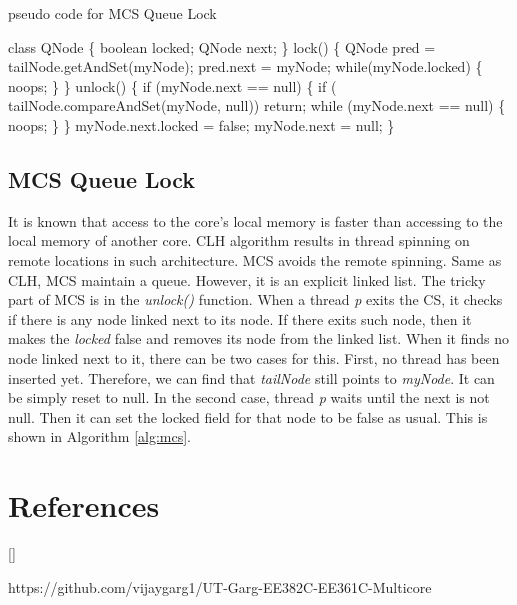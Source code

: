 \documentclass[twoside]{article}
\def\beginrefs{\begin{list}%
        {[\arabic{equation}]}{\usecounter{equation}
         \setlength{\leftmargin}{2.0truecm}\setlength{\labelsep}{0.4truecm}%
         \setlength{\labelwidth}{1.6truecm}}}
\def\endrefs{\end{list}}
\def\bibentry#1{\item[\hbox{[#1]}]}
\begin{document}
\begin{algorithm}
\caption{pseudo code for MCS Queue Lock}
\begin{algorithmic}[1]
\State class QNode \{
\State \indent boolean locked; 
\State \indent QNode next; 
\State \}
\State lock() \{
\State \indent QNode pred = tailNode.getAndSet(myNode);
\State \indent pred.next = myNode; 
\State \indent while(myNode.locked) \{ noops; \}
\State \}
\State unlock() \{
\State \indent if (myNode.next == null) \{
\State \indent \indent if ( tailNode.compareAndSet(myNode, null)) return;
\State \indent \indent while (myNode.next == null) \{ noops; \}
\State \indent \}
\State \indent myNode.next.locked = false;
\State \indent myNode.next = null;
\State \}
\end{algorithmic}
\label{alg:mcs}
\end{algorithm}

\subsection{MCS Queue Lock}
It is known that access to the core's local memory is faster than accessing to the local memory of another core. CLH algorithm results in thread spinning on remote locations in such architecture. MCS avoids the remote spinning. Same as CLH, MCS maintain a queue. However, it is an explicit linked list. 
The tricky part of MCS is in the \textit{unlock()} function. When a thread \textit{p} exits the CS, it checks if there is any node linked next to its node. If there exits such node, then it makes the \textit{locked} false and removes its node from the linked list. When it finds no node linked next to it, there can be two cases for this. First, no thread has been inserted yet. Therefore, we can find that \textit{tailNode} still points to \textit{myNode}. It can be simply reset to null. In the second case, thread \textit{p} waits until the next is not null. Then it can set the locked field for that node to be false as usual. This is shown in Algorithm \ref{alg:mcs}.


\section*{References}
\beginrefs
\bibentry{1} https://github.com/vijaygarg1/UT-Garg-EE382C-EE361C-Multicore
\endrefs
\end{document}
